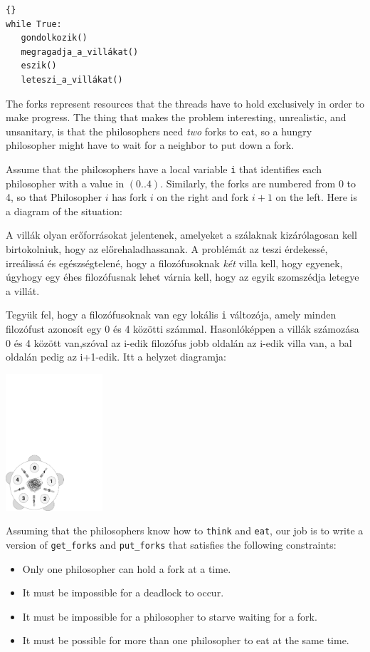 \documentclass{book}
\begin{document}
\begin{lstlisting}[title={Alapvető filozófus hurok}]{}
while True:
   gondolkozik()
   megragadja_a_villákat()
   eszik()
   leteszi_a_villákat()
\end{lstlisting}

The forks represent resources that the threads have to hold
exclusively in order to make progress.  The thing that makes the
problem interesting, unrealistic, and unsanitary, is that the
philosophers need {\em two} forks to eat, so a hungry philosopher
might have to wait for a neighbor to put down a fork.

Assume that the philosophers have a local variable {\tt i} that
identifies each philosopher with a value in $(0..4)$.  Similarly,
the forks are numbered from 0 to 4, so that Philosopher $i$ has
fork $i$ on the right and fork $i+1$ on
the left.  Here is a diagram of the situation:

A villák olyan erőforrásokat jelentenek, amelyeket a szálaknak
kizárólagosan kell birtokolniuk, hogy az előrehaladhassanak. A problémát
az teszi érdekessé, irreálissá és egészségtelené, hogy a filozófusoknak
{\em két} villa kell, hogy egyenek, úgyhogy egy éhes filozófusnak lehet
várnia kell, hogy az egyik szomszédja letegye a villát.

Tegyük fel, hogy a filozófusoknak van egy lokális {\tt i} változója, amely
minden filozófust azonosít egy 0 és 4 közötti számmal. Hasonlóképpen a villák
számozása 0 és 4 között van,szóval az i-edik filozófus jobb oldalán
az i-edik villa van, a bal oldalán pedig az i+1-edik. Itt a helyzet
diagramja:

\centerline{\includegraphics[height=2in]{table}}

Assuming that the philosophers know how to {\tt think} and {\tt eat},
our job is to write a version of {\tt get\_forks} and {\tt put\_forks}
that satisfies the following constraints:

\begin{itemize}

\item Only one philosopher can hold a fork at a time.

\item It must be impossible for a deadlock to occur.

\item It must be impossible for a philosopher to starve waiting
for a fork.

\item It must be possible for more than one philosopher
to eat at the same time.

\end{itemize}
\end{document}
